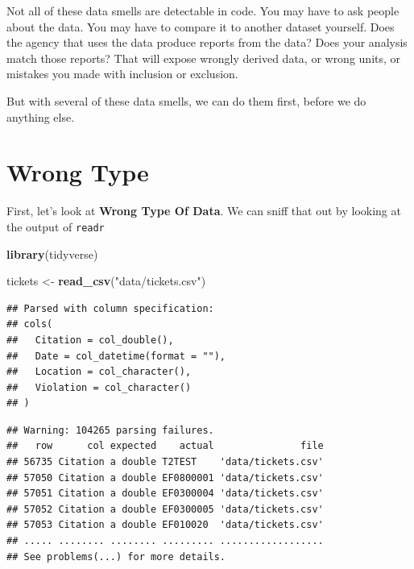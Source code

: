 \documentclass[]{book}
\newenvironment{Shaded}{\begin{snugshade}}{\end{snugshade}}
\newcommand{\KeywordTok}[1]{\textcolor[rgb]{0.13,0.29,0.53}{\textbf{#1}}}
\newcommand{\NormalTok}[1]{#1}
\newcommand{\StringTok}[1]{\textcolor[rgb]{0.31,0.60,0.02}{#1}}
\begin{document}
Not all of these data smells are detectable in code. You may have to ask people about the data. You may have to compare it to another dataset yourself. Does the agency that uses the data produce reports from the data? Does your analysis match those reports? That will expose wrongly derived data, or wrong units, or mistakes you made with inclusion or exclusion.

But with several of these data smells, we can do them first, before we do anything else.

\hypertarget{wrong-type}{%
\section{Wrong Type}\label{wrong-type}}

First, let's look at \textbf{Wrong Type Of Data}. We can sniff that out by looking at the output of \texttt{readr}

\begin{Shaded}
\begin{Highlighting}[]
\KeywordTok{library}\NormalTok{(tidyverse)}
\end{Highlighting}
\end{Shaded}

\begin{Shaded}
\begin{Highlighting}[]
\NormalTok{tickets <-}\StringTok{ }\KeywordTok{read_csv}\NormalTok{(}\StringTok{"data/tickets.csv"}\NormalTok{)}
\end{Highlighting}
\end{Shaded}

\begin{verbatim}
## Parsed with column specification:
## cols(
##   Citation = col_double(),
##   Date = col_datetime(format = ""),
##   Location = col_character(),
##   Violation = col_character()
## )
\end{verbatim}

\begin{verbatim}
## Warning: 104265 parsing failures.
##   row      col expected    actual               file
## 56735 Citation a double T2TEST    'data/tickets.csv'
## 57050 Citation a double EF0800001 'data/tickets.csv'
## 57051 Citation a double EF0300004 'data/tickets.csv'
## 57052 Citation a double EF0300005 'data/tickets.csv'
## 57053 Citation a double EF010020  'data/tickets.csv'
## ..... ........ ........ ......... ..................
## See problems(...) for more details.
\end{verbatim}
\end{document}
